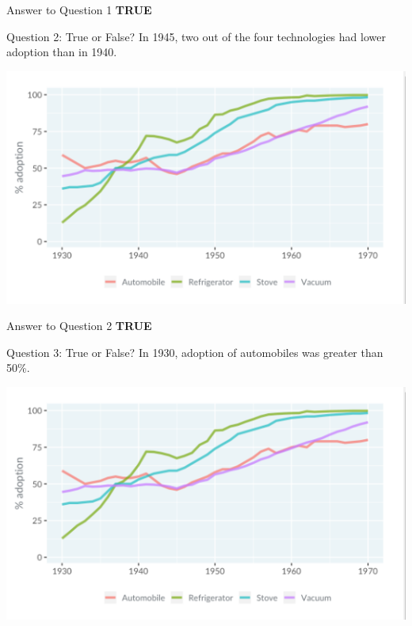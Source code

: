 \documentclass[
  ignorenonframetext,
]{beamer}
\begin{document}
\begin{frame}{Answer to Question 1}
\label{answer-to-question-1-1}
\textbf{TRUE}
\end{frame}

\begin{frame}{Question 2: True or False?}
\label{question-2-true-or-false-1}
In 1945, two out of the four technologies had lower adoption than in
1940.

\includegraphics{../images/im48.png}
\end{frame}

\begin{frame}{Answer to Question 2}
\label{answer-to-question-2-1}
\textbf{TRUE}
\end{frame}

\begin{frame}{Question 3: True or False?}
\label{question-3-true-or-false-1}
In 1930, adoption of automobiles was greater than 50\%.

\includegraphics{../images/im48.png}
\end{frame}
\end{document}
